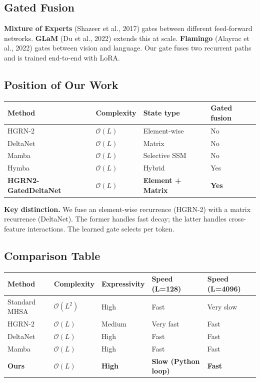 \subsection{Gated Fusion}

\textbf{Mixture of Experts} (Shazeer et al., 2017) gates between different 
feed-forward networks. \textbf{GLaM} (Du et al., 2022) extends this at scale. 
\textbf{Flamingo} (Alayrac et al., 2022) gates between vision and language. 
Our gate fuses two recurrent paths and is trained end-to-end with LoRA.

\subsection{Position of Our Work}

\begin{table}[H]
\centering
\small
\begin{tabular}{llll}
\toprule
\textbf{Method} & \textbf{Complexity} & \textbf{State type} & \textbf{Gated fusion} \\
\midrule
HGRN-2 & $\mathcal{O}(L)$ & Element-wise & No \\
DeltaNet & $\mathcal{O}(L)$ & Matrix & No \\
Mamba & $\mathcal{O}(L)$ & Selective SSM & No \\
Hymba & $\mathcal{O}(L)$ & Hybrid & Yes \\
\textbf{HGRN2-GatedDeltaNet} & $\mathcal{O}(L)$ & \textbf{Element + Matrix} & \textbf{Yes} \\
\bottomrule
\end{tabular}
\end{table}

\textbf{Key distinction.} We fuse an element-wise recurrence (HGRN-2) with a 
matrix recurrence (DeltaNet). The former handles fast decay; the latter 
handles cross-feature interactions. The learned gate selects per token.



\subsection{Comparison Table}

\begin{table}[H]
\centering
\small
\begin{tabular}{lllll}
\toprule
\textbf{Method} & \textbf{Complexity} & \textbf{Expressivity} & \textbf{Speed (L=128)} & \textbf{Speed (L=4096)} \\
\midrule
Standard MHSA & $\mathcal{O}(L^2)$ & High & Fast & Very slow \\
HGRN-2 & $\mathcal{O}(L)$ & Medium & Very fast & Fast \\
DeltaNet & $\mathcal{O}(L)$ & High & Fast & Fast \\
Mamba & $\mathcal{O}(L)$ & High & Fast & Fast \\
\textbf{Ours} & $\mathcal{O}(L)$ & \textbf{High} & \textbf{Slow (Python loop)} & \textbf{Fast} \\
\bottomrule
\end{tabular}
\end{table}

